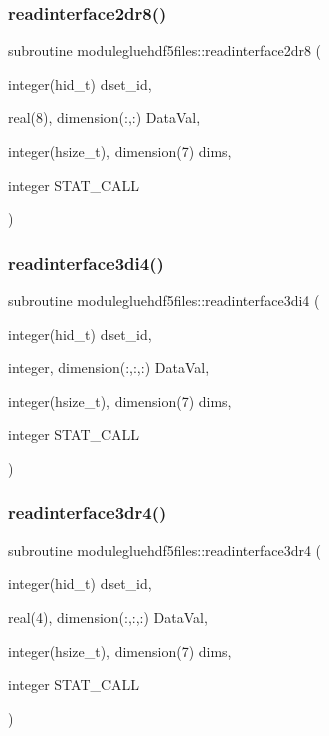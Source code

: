 \subsubsection{\texorpdfstring{readinterface2dr8()}{readinterface2dr8()}}
{\footnotesize\ttfamily subroutine modulegluehdf5files\+::readinterface2dr8 (\begin{DoxyParamCaption}\item[{integer(hid\+\_\+t)}]{dset\+\_\+id,  }\item[{real(8), dimension(\+:,\+:)}]{Data\+Val,  }\item[{integer(hsize\+\_\+t), dimension(7)}]{dims,  }\item[{integer}]{S\+T\+A\+T\+\_\+\+C\+A\+LL }\end{DoxyParamCaption})\hspace{0.3cm}{\ttfamily [private]}}

\mbox{\label{namespacemodulegluehdf5files_a299ce12989f72b96cfb4d801675689ac}} 
\subsubsection{\texorpdfstring{readinterface3di4()}{readinterface3di4()}}
{\footnotesize\ttfamily subroutine modulegluehdf5files\+::readinterface3di4 (\begin{DoxyParamCaption}\item[{integer(hid\+\_\+t)}]{dset\+\_\+id,  }\item[{integer, dimension(\+:,\+:,\+:)}]{Data\+Val,  }\item[{integer(hsize\+\_\+t), dimension(7)}]{dims,  }\item[{integer}]{S\+T\+A\+T\+\_\+\+C\+A\+LL }\end{DoxyParamCaption})\hspace{0.3cm}{\ttfamily [private]}}

\mbox{\label{namespacemodulegluehdf5files_a645aa70b5f322da2680c2517ec2c3cd2}} 
\subsubsection{\texorpdfstring{readinterface3dr4()}{readinterface3dr4()}}
{\footnotesize\ttfamily subroutine modulegluehdf5files\+::readinterface3dr4 (\begin{DoxyParamCaption}\item[{integer(hid\+\_\+t)}]{dset\+\_\+id,  }\item[{real(4), dimension(\+:,\+:,\+:)}]{Data\+Val,  }\item[{integer(hsize\+\_\+t), dimension(7)}]{dims,  }\item[{integer}]{S\+T\+A\+T\+\_\+\+C\+A\+LL }\end{DoxyParamCaption})\hspace{0.3cm}{\ttfamily [private]}}

